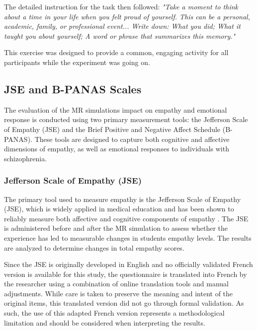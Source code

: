 The detailed instruction for the task then followed: \textit{"Take a moment to think about a time in your life when you felt proud of yourself. This can be a personal, academic, family, or professional event... Write down: What you did; What it taught you about yourself; A word or phrase that summarizes this memory."} 

This exercise was designed to provide a common, engaging activity for all participants while the experiment was going on.

\subsection{JSE and B-PANAS Scales}
\label{ch:eval}
The evaluation of the MR simulations impact on empathy and emotional response is conducted using two primary measurement tools: the Jefferson Scale of Empathy (JSE) and the Brief Positive and Negative Affect Schedule (B-PANAS). These tools are designed to capture both cognitive and affective dimensions of empathy, as well as emotional responses to individuals with schizophrenia.

\subsubsection{Jefferson Scale of Empathy (JSE)}
\label{sec:jse}

The primary tool used to measure empathy is the Jefferson Scale of Empathy (JSE), which is widely applied in medical education and has been shown to reliably measure both affective and cognitive components of empathy \cite{Hojat2002}. The JSE is administered before and after the MR simulation to assess whether the experience has led to measurable changes in students empathy levels. The results are analyzed to determine changes in total empathy scores.

\vspace{1em}

Since the JSE is originally developed in English and no officially validated French version is available for this study, the questionnaire is translated into French by the researcher using a combination of online translation tools and manual adjustments. While care is taken to preserve the meaning and intent of the original items, this translated version did not go through formal validation. As such, the use of this adapted French version represents a methodological limitation and should be considered when interpreting the results.

\vspace{1em}


